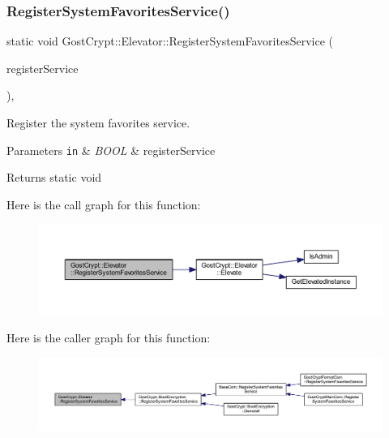 \subsubsection{\texorpdfstring{Register\+System\+Favorites\+Service()}{RegisterSystemFavoritesService()}}
{\footnotesize\ttfamily static void Gost\+Crypt\+::\+Elevator\+::\+Register\+System\+Favorites\+Service (\begin{DoxyParamCaption}\item[{B\+O\+OL}]{register\+Service }\end{DoxyParamCaption})\hspace{0.3cm}{\ttfamily [inline]}, {\ttfamily [static]}}



Register the system favorites service. 


\begin{DoxyParams}[1]{Parameters}
\mbox{\tt in}  & {\em B\+O\+OL} & register\+Service \\
\hline
\end{DoxyParams}
\begin{DoxyReturn}{Returns}
static void 
\end{DoxyReturn}
Here is the call graph for this function\+:
\nopagebreak
\begin{figure}[H]
\begin{center}
\leavevmode
\includegraphics[width=350pt]{class_gost_crypt_1_1_elevator_a9289f57f90900b6b46a8e930d84b24ad_cgraph}
\end{center}
\end{figure}
Here is the caller graph for this function\+:
\nopagebreak
\begin{figure}[H]
\begin{center}
\leavevmode
\includegraphics[width=350pt]{class_gost_crypt_1_1_elevator_a9289f57f90900b6b46a8e930d84b24ad_icgraph}
\end{center}
\end{figure}
\mbox{\label{class_gost_crypt_1_1_elevator_a911b8cbe1a7aa7e2aebb7aec14dce4f7}} 
